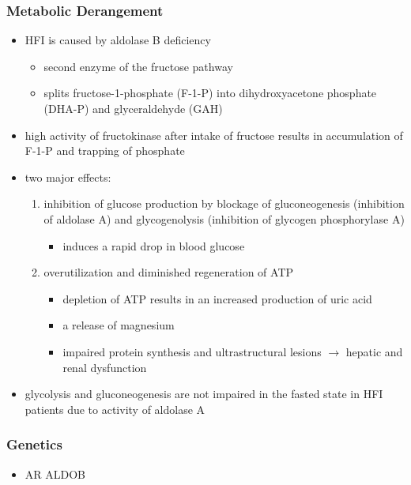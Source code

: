 \documentclass{scrartcl}
\begin{document}
\subsubsection{Metabolic Derangement}
\label{sec:org8cf0883}
\begin{itemize}
\item HFI is caused by aldolase B deficiency
\begin{itemize}
\item second enzyme of the fructose pathway
\item splits fructose-1-phosphate (F-1-P) into dihydroxyacetone phosphate (DHA-P) and glyceraldehyde (GAH)
\end{itemize}
\item high activity of fructokinase after intake of fructose results in
accumulation of F-1-P and trapping of phosphate
\item two major effects:
\begin{enumerate}
\item inhibition of glucose production by blockage of gluconeogenesis
(inhibition of aldolase A) and glycogenolysis (inhibition of glycogen phosphorylase A)
\begin{itemize}
\item induces a rapid drop in blood glucose
\end{itemize}
\item overutilization and diminished regeneration of ATP
\begin{itemize}
\item depletion of ATP results in an increased production of uric acid
\item a release of magnesium
\item impaired protein synthesis and ultrastructural lesions \(\to\)
hepatic and renal dysfunction
\end{itemize}
\end{enumerate}
\item glycolysis and gluconeogenesis are not impaired in the fasted state
in HFI patients due to activity of aldolase A
\end{itemize}

\subsubsection{Genetics}
\label{sec:org0e1cc1d}
\begin{itemize}
\item AR ALDOB
\end{itemize}
\end{document}
